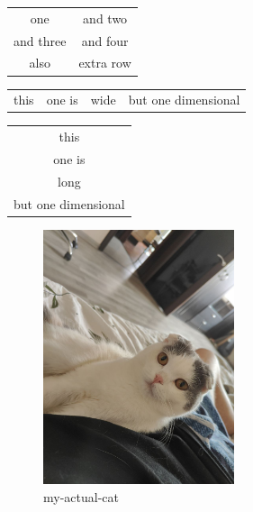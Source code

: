 \documentclass{article}
\begin{document}
\begin{center}
  \begin{tabular}{ c c }
    one & and two \\
    and three & and four \\
    also & extra row
  \end{tabular}
\end{center}
\begin{center}
  \begin{tabular}{ c c c c }
    this & one is & wide & but one dimensional
  \end{tabular}
\end{center}
\begin{center}
  \begin{tabular}{ c }
    this \\
    one is \\
    long \\
    but one dimensional
  \end{tabular}
\end{center}
\begin{figure}[h!]
\centering
  \includegraphics[width=0.5\textwidth]{my_actual_cat.png}
  \caption{my-actual-cat}
\end{figure}
\end{document}
